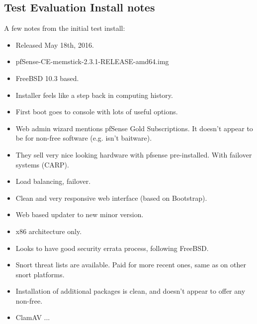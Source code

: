 \subsection{Test Evaluation Install notes}

A few notes from the initial test install:

\begin{itemize}
 \item Released May 18th, 2016.
 \item pfSense-CE-memstick-2.3.1-RELEASE-amd64.img
 \item FreeBSD 10.3 based.
 \item Installer feels like a step back in computing history.
 \item First boot goes to console with lots of useful options.
 \item Web admin wizard mentions pfSense Gold Subscriptions. It doesn't appear to be for non-free software (e.g. isn't baitware).
 \item They sell very nice looking hardware with pfsense pre-installed. With failover systems (CARP).
 \item Load balancing, failover.
 \item Clean and very responsive web interface (based on Bootstrap).
 \item Web based updater to new minor version.
 \item x86 architecture only.
 \item Looks to have good security errata process, following FreeBSD.
 \item Snort threat lists are available. Paid for more recent ones, same as on other snort platforms.
 \item Installation of additional packages is clean, and doesn't appear to offer any non-free.
 \item ClamAV ...
\end{itemize}

